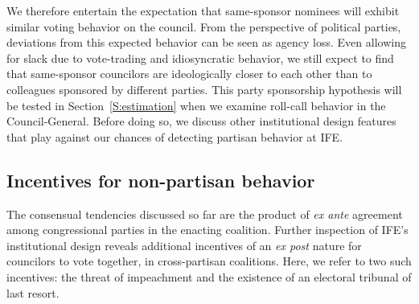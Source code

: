 \documentclass[12 pt, letter]{article}
\begin{document}
We therefore entertain the expectation that same-sponsor nominees
will exhibit similar voting behavior on the council. From the
perspective of political parties, deviations from this expected
behavior can be seen as agency loss.  Even allowing for slack due
to vote-trading and idiosyncratic behavior, we still expect to find
that same-sponsor councilors are ideologically closer to each other
than to colleagues sponsored by different parties.  This party
sponsorship hypothesis will be tested in Section~\ref{S:estimation}
when we examine roll-call behavior in the Council-General.  Before
doing so, we discuss other institutional design features that play
against our chances of detecting partisan behavior at IFE.

\subsection{Incentives for non-partisan behavior}
The consensual tendencies discussed so far are the product of
\emph{ex ante} agreement among congressional parties in the enacting
coalition.  Further inspection of IFE's institutional design reveals
additional incentives of an \emph{ex post} nature for councilors to
vote together, in cross-partisan coalitions.  Here, we refer to two
such incentives: the threat of impeachment and the existence of an
electoral tribunal of last resort.
\end{document}
